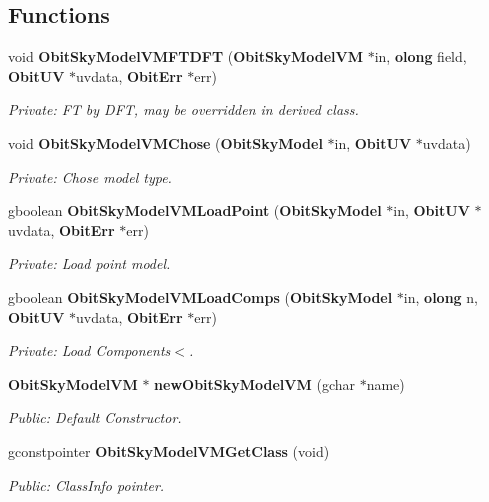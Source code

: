 \subsection*{Functions}
\begin{CompactItemize}
\item 
void {\bf Obit\-Sky\-Model\-VMFTDFT} ({\bf Obit\-Sky\-Model\-VM} $\ast$in, {\bf olong} field, {\bf Obit\-UV} $\ast$uvdata, {\bf Obit\-Err} $\ast$err)
\begin{CompactList}\small\item\em Private: FT by DFT, may be overridden in derived class. \item\end{CompactList}\item 
void {\bf Obit\-Sky\-Model\-VMChose} ({\bf Obit\-Sky\-Model} $\ast$in, {\bf Obit\-UV} $\ast$uvdata)
\begin{CompactList}\small\item\em Private: Chose model type. \item\end{CompactList}\item 
gboolean {\bf Obit\-Sky\-Model\-VMLoad\-Point} ({\bf Obit\-Sky\-Model} $\ast$in, {\bf Obit\-UV} $\ast$uvdata, {\bf Obit\-Err} $\ast$err)
\begin{CompactList}\small\item\em Private: Load point model. \item\end{CompactList}\item 
gboolean {\bf Obit\-Sky\-Model\-VMLoad\-Comps} ({\bf Obit\-Sky\-Model} $\ast$in, {\bf olong} n, {\bf Obit\-UV} $\ast$uvdata, {\bf Obit\-Err} $\ast$err)
\begin{CompactList}\small\item\em Private: Load Components$<$. \item\end{CompactList}\item 
{\bf Obit\-Sky\-Model\-VM} $\ast$ {\bf new\-Obit\-Sky\-Model\-VM} (gchar $\ast$name)
\begin{CompactList}\small\item\em Public: Default Constructor. \item\end{CompactList}\item 
gconstpointer {\bf Obit\-Sky\-Model\-VMGet\-Class} (void)
\begin{CompactList}\small\item\em Public: Class\-Info pointer. \item\end{CompactList}\item 

\end{CompactItemize}
